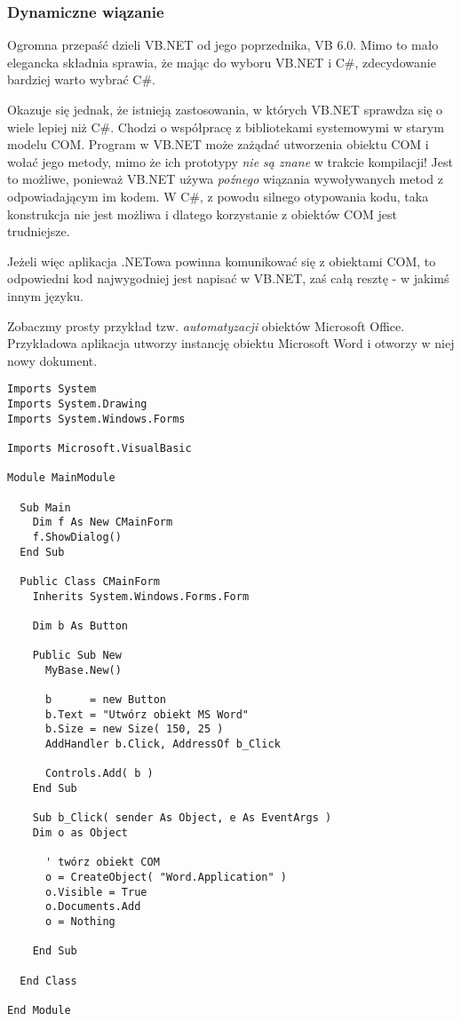 \subsubsection{Dynamiczne wiązanie}

Ogromna przepaść dzieli VB.NET od jego poprzednika, VB 6.0. Mimo to mało elegancka składnia sprawia, że
mając do wyboru VB.NET i C\#, zdecydowanie bardziej warto wybrać C\#. 

Okazuje się jednak, że istnieją zastosowania, w których VB.NET sprawdza się o wiele lepiej niż
C\#. Chodzi o współpracę z bibliotekami systemowymi w starym modelu COM. Program w VB.NET może
zażądać utworzenia obiektu COM i wołać jego metody, mimo że ich prototypy {\em nie są znane} w
trakcie kompilacji! Jest to możliwe, ponieważ VB.NET używa {\em poźnego} wiązania wywoływanych
metod z odpowiadającym im kodem. W C\#, z powodu silnego otypowania kodu, taka konstrukcja nie
jest możliwa i dlatego korzystanie z obiektów COM jest trudniejsze.

Jeżeli więc aplikacja .NETowa powinna komunikować się z obiektami COM, to odpowiedni kod
najwygodniej jest napisać w VB.NET, zaś całą resztę - w jakimś innym języku.

Zobaczmy prosty przykład tzw. {\em automatyzacji} obiektów Microsoft Office. Przykładowa aplikacja
utworzy instancję obiektu Microsoft Word i otworzy w niej nowy dokument.

\begin{scriptsize}
\begin{verbatim}
Imports System
Imports System.Drawing
Imports System.Windows.Forms

Imports Microsoft.VisualBasic

Module MainModule

  Sub Main
    Dim f As New CMainForm
    f.ShowDialog()
  End Sub
	
  Public Class CMainForm
    Inherits System.Windows.Forms.Form

    Dim b As Button

    Public Sub New
      MyBase.New()

      b      = new Button
      b.Text = "Utwórz obiekt MS Word"
      b.Size = new Size( 150, 25 )
      AddHandler b.Click, AddressOf b_Click

      Controls.Add( b )
    End Sub

    Sub b_Click( sender As Object, e As EventArgs )
    Dim o as Object

      ' twórz obiekt COM
      o = CreateObject( "Word.Application" )
      o.Visible = True
      o.Documents.Add
      o = Nothing

    End Sub
    		
  End Class
	
End Module
\end{verbatim}
\end{scriptsize}

